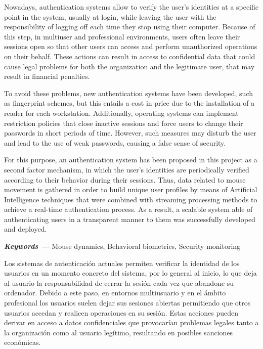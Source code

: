 \label{sec:abstract}

Nowadays, authentication systems allow to verify the user's identities at a specific point in the system, usually at login, while leaving the user with the responsibility of logging off each time they stop using their computer. Because of this step, in multiuser and professional environments, users often leave their sessions open so that other users can access and perform unauthorized operations on their behalf. These actions can result in access to confidential data that could cause legal problems for both the organization and the legitimate user, that may result in financial penalties.

To avoid these problems, new authentication systems have been developed, such as fingerprint schemes, but this entails a cost in price due to the installation of a reader for each workstation. Additionally, operating systems can implement restriction policies that close inactive sessions and force users to change their passwords in short periods of time. However, such measures may disturb the user and lead to the use of weak passwords, causing a false sense of security.


For this purpose, an authentication system has been proposed in this project as a second factor mechanism, in which the user's identities are periodically verified according to their behavior during their sessions. Thus, data related to mouse movement is gathered in order to build unique user profiles by means of Artificial Intelligence techniques that were combined with streaming processing methods to achieve a real-time authentication process. As a result, a scalable system able of authenticating users in a transparent manner to them was successfully developed and deployed.



{\vspace{5mm}\textbf{\textit{Keywords ---}}
    Mouse dynamics,
    Behavioral biometrics,
    Security monitoring
}


\label{sec:resumen}

Los sistemas de autenticación actuales permiten verificar la identidad de los usuarios en un momento concreto del sistema, por lo general al inicio, lo que deja al usuario la responsabilidad de cerrar la sesión cada vez que abandone su ordenador. Debido a este paso, en entornos multiusuario y en el ámbito profesional los usuarios suelen dejar sus sesiones abiertas permitiendo que otros usuarios accedan y realicen operaciones en su sesión. Estas acciones pueden derivar en acceso a datos confidenciales que provocarían problemas legales tanto a la organización como al usuario legítimo, resultando en posibles sanciones económicas.

